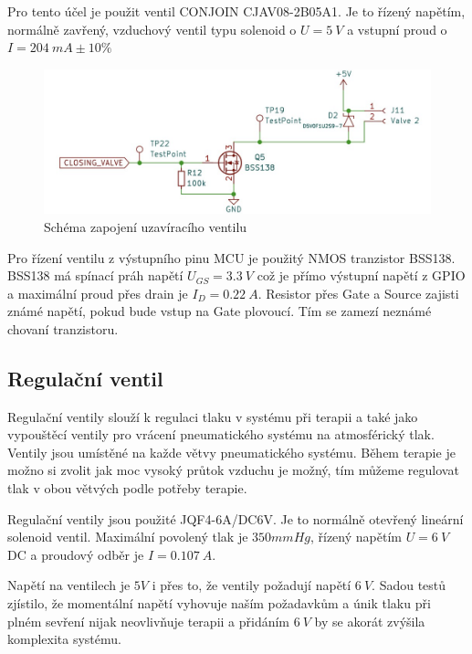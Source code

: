 Pro tento účel je použit ventil CONJOIN CJAV08-2B05A1. Je to řízený napětím, normálně zavřený, vzduchový ventil typu solenoid  o $U = 5 \ V$ a vstupní proud o $I = 204 \ mA \pm 10\% $

\begin{figure}[H]
\includegraphics[width=0.9\linewidth]{pictures/closing_valve_driver.jpg}
\caption{Schéma zapojení uzavíracího ventilu}
\label{fig:closing_valve_driver}
\end{figure}

Pro řízení ventilu z výstupního pinu MCU je použitý NMOS tranzistor BSS138. BSS138 má spínací práh napětí $U_{GS} = 3.3 \ V$ což je přímo výstupní napětí z GPIO a maximální proud přes drain je $I_D = 0.22 \ A$. Resistor přes Gate a Source zajisti známé napětí, pokud bude vstup na Gate plovoucí. Tím se zamezí neznámé chovaní tranzistoru.

\subsection{Regulační ventil}
Regulační ventily slouží k regulaci tlaku v systému při terapii a také jako vypouštěcí ventily pro vrácení pneumatického systému na atmosférický tlak. Ventily jsou umístěné na každe větvy pneumatického systému. Během terapie je možno si zvolit jak moc vysoký průtok vzduchu je možný, tím můžeme regulovat tlak v obou větvých podle potřeby terapie. \par 

Regulační ventily jsou použité JQF4-6A/DC6V. Je to normálně otevřený lineární solenoid ventil. Maximální povolený tlak je $350mmHg$, řízený napětím $U = 6 \ V$ DC a proudový odběr je $I = 0.107 \ A$.\par

Napětí na ventilech je $5V$ i přes to, že ventily požadují napětí $6 \ V$. Sadou testů zjístilo, že momentální napětí vyhovuje naším požadavkům a únik tlaku při plném sevření nijak neovlivňuje terapii a přidáním $6 \ V$ by se akorát zvýšila komplexita systému. 



